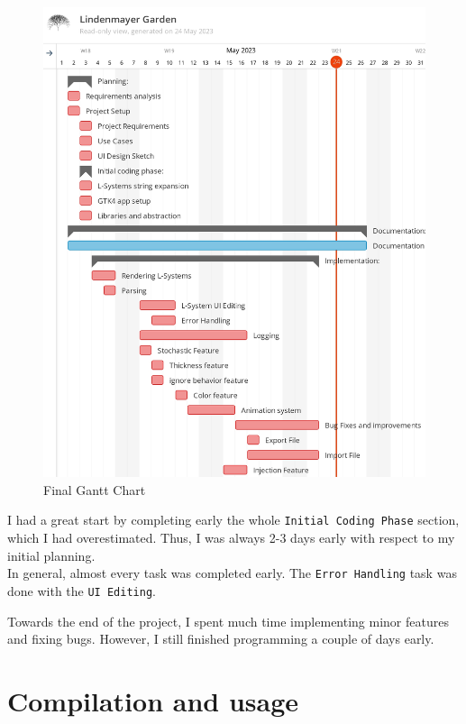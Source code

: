 \documentclass[a4paper]{article}
\begin{document}
\begin{figure}[h]
    \includegraphics[width=\textwidth]{media/gantt/gantt2.jpg}
    \caption{Final Gantt Chart}
\end{figure}

I had a great start by completing early the whole \texttt{Initial Coding Phase}
section, which I had overestimated.
Thus, I was always 2-3 days early with respect to my initial planning.
\\
In general, almost every task was completed early.
The \texttt{Error Handling} task was done with the \texttt{UI Editing}.

Towards the end of the project, I spent much time implementing minor features and fixing bugs.
However, I still finished programming a couple of days early.

\pagebreak

\section{Compilation and usage}
\end{document}
